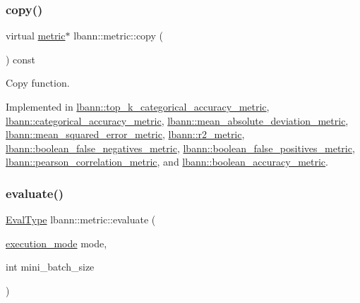 \subsubsection{\texorpdfstring{copy()}{copy()}}
{\footnotesize\ttfamily virtual \hyperlink{classlbann_1_1metric}{metric}$\ast$ lbann\+::metric\+::copy (\begin{DoxyParamCaption}{ }\end{DoxyParamCaption}) const\hspace{0.3cm}{\ttfamily [pure virtual]}}

Copy function. 

Implemented in \hyperlink{classlbann_1_1top__k__categorical__accuracy__metric_a2d93a9bca14d52bda02a58e4c58b800e}{lbann\+::top\+\_\+k\+\_\+categorical\+\_\+accuracy\+\_\+metric}, \hyperlink{classlbann_1_1categorical__accuracy__metric_a46ce5b6eb09fecc8b0029fb62ba8cf66}{lbann\+::categorical\+\_\+accuracy\+\_\+metric}, \hyperlink{classlbann_1_1mean__absolute__deviation__metric_ad49148043214908a671799bcdd0b120b}{lbann\+::mean\+\_\+absolute\+\_\+deviation\+\_\+metric}, \hyperlink{classlbann_1_1mean__squared__error__metric_a4caa0dfc86361a1c9a91fb64efecfcc9}{lbann\+::mean\+\_\+squared\+\_\+error\+\_\+metric}, \hyperlink{classlbann_1_1r2__metric_a2536209f1d575b639ab351854d54f207}{lbann\+::r2\+\_\+metric}, \hyperlink{classlbann_1_1boolean__false__negatives__metric_abd0e7a6040232d5b6d8b10e79a3208c1}{lbann\+::boolean\+\_\+false\+\_\+negatives\+\_\+metric}, \hyperlink{classlbann_1_1boolean__false__positives__metric_a5d9544f3f4dc7e086cf203f5666a7660}{lbann\+::boolean\+\_\+false\+\_\+positives\+\_\+metric}, \hyperlink{classlbann_1_1pearson__correlation__metric_a2bb107028c6931a70ed7d886707b4006}{lbann\+::pearson\+\_\+correlation\+\_\+metric}, and \hyperlink{classlbann_1_1boolean__accuracy__metric_ae3a97a9ac1caccfe8ac46ad1a0df01a4}{lbann\+::boolean\+\_\+accuracy\+\_\+metric}.

\mbox{\label{classlbann_1_1metric_ab4e14cb4296c7b47719071b210448dec}} 
\subsubsection{\texorpdfstring{evaluate()}{evaluate()}}
{\footnotesize\ttfamily \hyperlink{base_8hpp_a3266f5ac18504bbadea983c109566867}{Eval\+Type} lbann\+::metric\+::evaluate (\begin{DoxyParamCaption}\item[{\hyperlink{base_8hpp_a2781a159088df64ed7d47cc91c4dc0a8}{execution\+\_\+mode}}]{mode,  }\item[{int}]{mini\+\_\+batch\+\_\+size }\end{DoxyParamCaption})}

